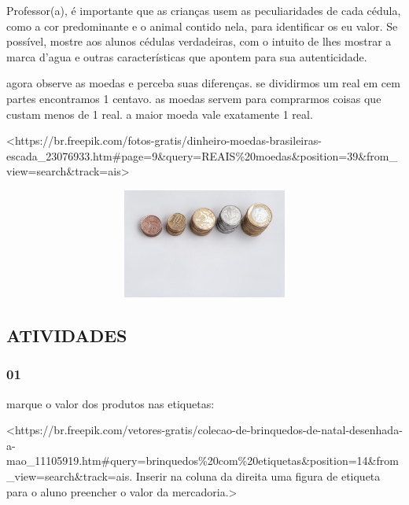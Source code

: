 Professor(a), é importante que as crianças usem as peculiaridades de
cada cédula, como a cor predominante e o animal contido nela, para
identificar os eu valor. Se possível, mostre aos alunos cédulas
verdadeiras, com o intuito de lhes mostrar a marca d'agua e outras
características que apontem para sua autenticidade.

agora observe as moedas e perceba suas diferenças. se dividirmos um real
em cem partes encontramos 1 centavo. as moedas servem para comprarmos
coisas que custam menos de 1 real. a maior moeda vale exatamente 1 real.

\textless{}https://br.freepik.com/fotos-gratis/dinheiro-moedas-brasileiras-escada\_23076933.htm\#page=9\&query=REAIS\%20moedas\&position=39\&from\_view=search\&track=ais\textgreater{}

\includegraphics[width=5.90556in,height=1.41667in]{media/image54.jpg}\protect\hypertarget{_heading=h.eii4svey01jf}{}{}

\subsection{ATIVIDADES}\label{atividades-4}

\subsubsection{01}\label{section-54}

marque o valor dos produtos nas etiquetas:

\textless{}https://br.freepik.com/vetores-gratis/colecao-de-brinquedos-de-natal-desenhada-a-mao\_11105919.htm\#query=brinquedos\%20com\%20etiquetas\&position=14\&from\_view=search\&track=ais.
Inserir na coluna da direita uma figura de etiqueta para o aluno
preencher o valor da mercadoria.\textgreater{}

